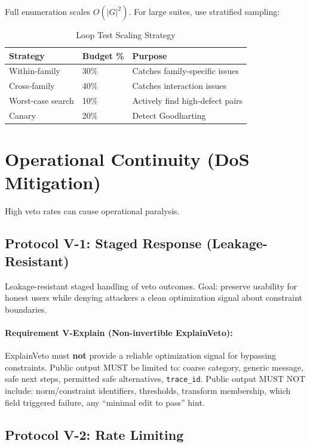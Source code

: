 \documentclass[11pt,letterpaper]{article}
\theoremstyle{definition}
\theoremstyle{remark}
\begin{document}
Full enumeration scales $O(|G|^2)$. For large suites, use stratified sampling:

\begin{table}[h]
\centering
\begin{tabular}{@{}lll@{}}
\toprule
\textbf{Strategy} & \textbf{Budget \%} & \textbf{Purpose} \\
\midrule
Within-family & 30\% & Catches family-specific issues \\
Cross-family & 40\% & Catches interaction issues \\
Worst-case search & 10\% & Actively find high-defect pairs \\
Canary & 20\% & Detect Goodharting \\
\bottomrule
\end{tabular}
\caption{Loop Test Scaling Strategy}
\end{table}


\section{Operational Continuity (DoS Mitigation)}

High veto rates can cause operational paralysis.

\subsection{Protocol V-1: Staged Response (Leakage-Resistant)}

Leakage-resistant staged handling of veto outcomes. Goal: preserve usability for honest users while denying attackers a clean optimization signal about constraint boundaries.

\paragraph{Requirement V-Explain (Non-invertible ExplainVeto):} ExplainVeto must \textbf{not} provide a reliable optimization signal for bypassing constraints. Public output MUST be limited to: coarse category, generic message, safe next steps, permitted safe alternatives, \texttt{trace\_id}. Public output MUST NOT include: norm/constraint identifiers, thresholds, transform membership, which field triggered failure, any ``minimal edit to pass'' hint.

\subsection{Protocol V-2: Rate Limiting}
\end{document}
